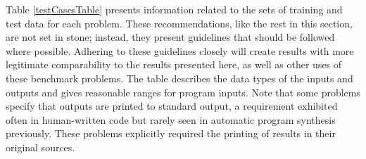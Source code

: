 \documentclass{sig-alternate}
\begin{document}

Table \ref{testCasesTable} presents information related to the sets of training and test data for each problem. These recommendations, like the rest in this section, are not set in stone; instead, they present guidelines that should be followed where possible. Adhering to these guidelines closely will create results with more legitimate comparability to the results presented here, as well as other uses of these benchmark problems. The table describes the data types of the inputs and outputs and gives reasonable ranges for program inputs. Note that some problems specify that outputs are printed to standard output, a requirement exhibited often in human-written code but rarely seen in automatic program synthesis previously. These problems explicitly required the printing of results in their original sources.
\end{document}
